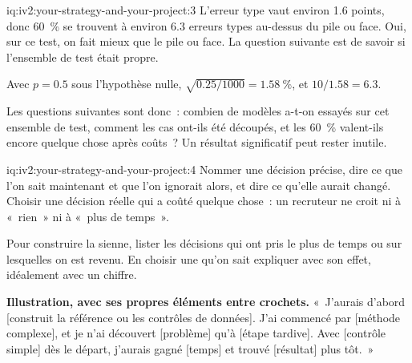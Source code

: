 \begin{solution}{iq:iv2:your-strategy-and-your-project:3}
L'erreur type vaut environ 1.6 points, donc 60~\% se trouvent à environ 6.3 erreurs types au-dessus du pile ou face. Oui, sur ce test, on fait mieux que le pile ou face. La question suivante est de savoir si l'ensemble de test était propre.

Avec $p = 0.5$ sous l'hypothèse nulle, $\sqrt{0.25/1000} = 1.58~\%$, et $10/1.58 = 6.3$.

Les questions suivantes sont donc~: combien de modèles a-t-on essayés sur cet ensemble de test, comment les cas ont-ils été découpés, et les 60~\% valent-ils encore quelque chose après coûts~? Un résultat significatif peut rester inutile.

\end{solution}

\begin{solution}{iq:iv2:your-strategy-and-your-project:4}
Nommer une décision précise, dire ce que l'on sait maintenant et que l'on ignorait alors, et dire ce qu'elle aurait changé. Choisir une décision réelle qui a coûté quelque chose~: un recruteur ne croit ni à «~rien~» ni à «~plus de temps~».

Pour construire la sienne, lister les décisions qui ont pris le plus de temps ou sur lesquelles on est revenu. En choisir une qu'on sait expliquer avec son effet, idéalement avec un chiffre.

\textbf{Illustration, avec ses propres éléments entre crochets.} «~J'aurais d'abord [construit la référence ou les contrôles de données]. J'ai commencé par [méthode complexe], et je n'ai découvert [problème] qu'à [étape tardive]. Avec [contrôle simple] dès le départ, j'aurais gagné [temps] et trouvé [résultat] plus tôt.~»

\end{solution}

